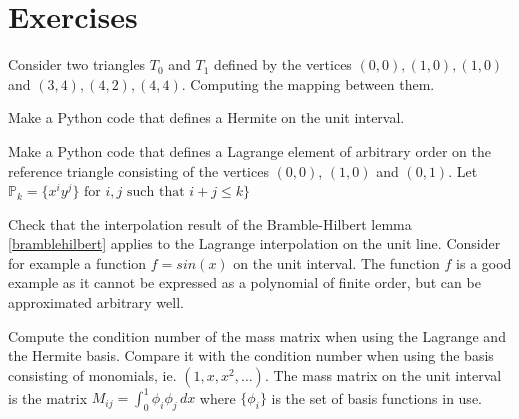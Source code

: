 \section{Exercises}


\begin{exercise}
Consider two triangles $T_0$ and $T_1$ defined by the vertices $(0,0), (1,0), (1,0)$ and
$(3,4), (4,2), (4,4)$. Computing the mapping between them.  
\end{exercise}


\begin{exercise}
\label{hermite:interval}
Make a Python code that defines a Hermite on the unit interval.       
\end{exercise}



\begin{exercise}
\label{lagrange:triangle}
Make a Python code that defines a Lagrange element of arbitrary order on the reference triangle 
consisting of the vertices $(0,0)$, $(1,0)$ and $(0,1)$. Let $\mathbb{P}_k = \{ x^i y^j \} \mbox{ for } i,j \mbox{ such that } i+j \le k\} $     
\end{exercise}

\begin{exercise}
Check that the interpolation result
of the Bramble-Hilbert lemma \ref{bramblehilbert} applies to the Lagrange interpolation on the unit line. Consider 
for example a function $f = sin(x)$ on the unit interval. The function $f$ is a good example as it cannot be expressed 
as a polynomial of finite order, but can be approximated arbitrary well. 
\end{exercise}

\begin{exercise}
Compute the condition number of the mass matrix when using the Lagrange and the Hermite basis. Compare it with the condition
number when using the basis consisting of monomials, ie. $(1, x, x^2, \ldots)$.   
	The mass matrix on the unit interval  is the matrix $M_{ij} = \int_0^1 \phi_i \phi_j \, dx $ where $\{\phi_i\}$ is 
	the set of basis functions in use. 
\end{exercise}





